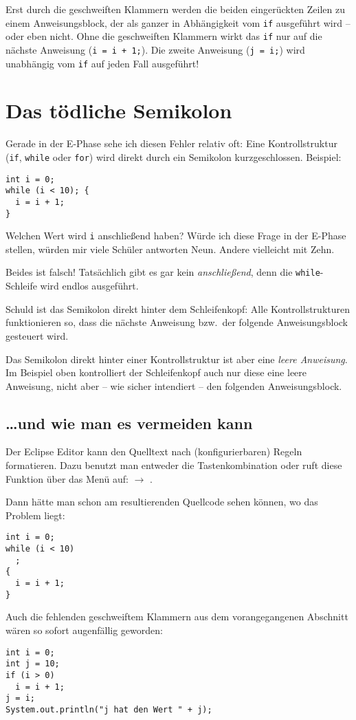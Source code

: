 Erst durch die geschweiften Klammern werden die beiden eingerückten Zeilen zu
einem Anweisungsblock, der als ganzer in Abhängigkeit vom \lstinline|if|
ausgeführt wird -- oder eben nicht. Ohne die geschweiften Klammern wirkt das
\lstinline|if| nur auf die nächste Anweisung (\lstinline|i = i + 1;|). Die
zweite Anweisung (\lstinline|j = i;|) wird unabhängig vom \lstinline|if| auf jeden Fall
ausgeführt!


\section{Das tödliche Semikolon}

Gerade in der E-Phase sehe ich diesen Fehler relativ oft: Eine Kontrollstruktur
(\lstinline|if|, \lstinline|while| oder \lstinline|for|) wird direkt durch ein
Semikolon \glqq kurzgeschlossen\grqq . Beispiel:

\begin{lstlisting}
int i = 0;
while (i < 10); {
  i = i + 1;
}
\end{lstlisting}

Welchen Wert wird \lstinline|i| anschließend haben? Würde ich diese Frage in der
E-Phase stellen, würden mir viele Schüler antworten \glqq Neun\grqq. Andere
vielleicht mit \glqq Zehn\grqq .

Beides ist falsch! Tatsächlich gibt es gar kein \emph{anschließend}, denn die
\lstinline|while|-Schleife wird endlos ausgeführt.

Schuld ist das Semikolon direkt hinter dem Schleifenkopf: Alle
Kontrollstrukturen funktionieren so, dass die nächste Anweisung bzw.\
der folgende Anweisungsblock gesteuert wird.

Das Semikolon direkt hinter einer Kontrollstruktur ist aber eine \emph{leere
Anweisung}. Im Beispiel oben kontrolliert der Schleifenkopf auch nur diese
eine leere Anweisung, nicht aber -- wie sicher intendiert -- den folgenden
Anweisungsblock.

\subsection{\ldots und wie man es vermeiden kann}

Der Eclipse Editor kann den Quelltext nach (konfigurierbaren) Regeln
formatieren. Dazu benutzt man entweder die Tastenkombination
 oder ruft diese Funktion über das Menü auf:
\myPMI{Source} $\rightarrow$ \myPMI{Format}.

Dann hätte man schon am resultierenden Quellcode sehen können, wo das Problem
liegt:

\begin{lstlisting}
int i = 0;
while (i < 10)
  ; 
{
  i = i + 1;
}
\end{lstlisting}

Auch die fehlenden geschweiftem Klammern aus dem vorangegangenen Abschnitt wären
so sofort augenfällig geworden:

\begin{lstlisting}
int i = 0;
int j = 10;
if (i > 0)
  i = i + 1;
j = i;
System.out.println("j hat den Wert " + j);
\end{lstlisting}